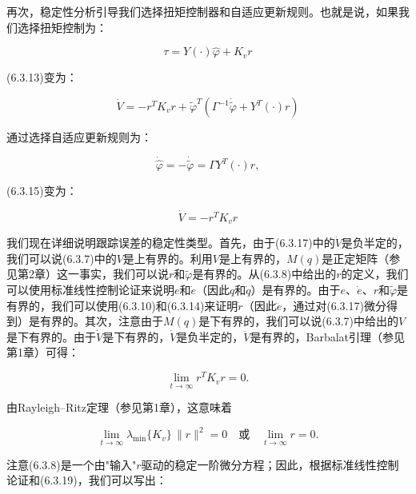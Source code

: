 \documentclass[12pt,a4paper]{ctexart}
\begin{document}
再次，稳定性分析引导我们选择扭矩控制器和自适应更新规则。也就是说，如果我们选择扭矩控制为：

\begin{equation}\label{eq:6.3.14}
\tau = Y(\cdot)\hat{\varphi} + K_v r
\end{equation}

(6.3.13)变为：

\begin{equation}\label{eq:6.3.15}
\dot{V} = -r^T K_v r + \tilde{\varphi}^T (\Gamma^{-1} \dot{\tilde{\varphi}} + Y^T(\cdot)r)
\end{equation}

通过选择自适应更新规则为：

\begin{equation}\label{eq:6.3.16}
\dot{\hat{\varphi}} = -\dot{\tilde{\varphi}} = \Gamma Y^T (\cdot) r,
\end{equation}

(6.3.15)变为：

\begin{equation}\label{eq:6.3.17}
\dot{V} = -r^T K_v r
\end{equation}

我们现在详细说明跟踪误差的稳定性类型。首先，由于(6.3.17)中的$\dot{V}$是负半定的，我们可以说(6.3.7)中的$V$是上有界的。利用$V$是上有界的，$M(q)$是正定矩阵（参见第2章）这一事实，我们可以说$r$和$\tilde{\varphi}$是有界的。从(6.3.8)中给出的$r$的定义，我们可以使用标准线性控制论证来说明$e$和$\dot{e}$（因此$q$和$\dot{q}$）是有界的。由于$e$、$\dot{e}$、$r$和$\tilde{\varphi}$是有界的，我们可以使用(6.3.10)和(6.3.14)来证明$\dot{r}$（因此$\ddot{e}$，通过对(6.3.17)微分得到）是有界的。其次，注意由于$M(q)$是下有界的，我们可以说(6.3.7)中给出的$V$是下有界的。由于$\dot{V}$是下有界的，$\dot{V}$是负半定的，$\ddot{V}$是有界的，Barbalat引理（参见第1章）可得：

\begin{equation}\label{eq:6.3.18}
\lim_{t \to \infty} r^T K_v r = 0.
\end{equation}

由Rayleigh--Ritz定理（参见第1章），这意味着

\begin{equation}\label{eq:6.3.19}
\lim_{t \to \infty} \lambda_{\min}\{K_v\}\,\|r\|^2 = 0 \quad \text{或} \quad \lim_{t \to \infty} r = 0.
\end{equation}

注意(6.3.8)是一个由"输入"$r$驱动的稳定一阶微分方程；因此，根据标准线性控制论证和(6.3.19)，我们可以写出：
\end{document}
